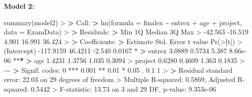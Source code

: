 \documentclass[
]{book}
\newenvironment{Shaded}{\begin{snugshade}}{\end{snugshade}}
\newcommand{\AttributeTok}[1]{\textcolor[rgb]{0.77,0.63,0.00}{#1}}
\newcommand{\DecValTok}[1]{\textcolor[rgb]{0.00,0.00,0.81}{#1}}
\newcommand{\ErrorTok}[1]{\textcolor[rgb]{0.64,0.00,0.00}{\textbf{#1}}}
\newcommand{\FloatTok}[1]{\textcolor[rgb]{0.00,0.00,0.81}{#1}}
\newcommand{\FunctionTok}[1]{\textcolor[rgb]{0.00,0.00,0.00}{#1}}
\newcommand{\NormalTok}[1]{#1}
\newcommand{\SpecialCharTok}[1]{\textcolor[rgb]{0.00,0.00,0.00}{#1}}
\newcommand{\StringTok}[1]{\textcolor[rgb]{0.31,0.60,0.02}{#1}}
\theoremstyle{definition}
\theoremstyle{definition}
\theoremstyle{definition}
\theoremstyle{definition}
\theoremstyle{remark}
\begin{document}
\hfill\break
\textbf{Model 2:}

\begin{Shaded}
\begin{Highlighting}[]
\FunctionTok{summary}\NormalTok{(model2)}
\SpecialCharTok{\textgreater{}} 
\ErrorTok{\textgreater{}}\NormalTok{ Call}\SpecialCharTok{:}
\ErrorTok{\textgreater{}} \FunctionTok{lm}\NormalTok{(}\AttributeTok{formula =}\NormalTok{ finalex }\SpecialCharTok{\textasciitilde{}}\NormalTok{ entrex }\SpecialCharTok{+}\NormalTok{ age }\SpecialCharTok{+}\NormalTok{ project, }\AttributeTok{data =}\NormalTok{ ExamData)}
\SpecialCharTok{\textgreater{}} 
\ErrorTok{\textgreater{}}\NormalTok{ Residuals}\SpecialCharTok{:}
\ErrorTok{\textgreater{}}\NormalTok{     Min      1Q  Median      3Q     Max }
\SpecialCharTok{\textgreater{}} \SpecialCharTok{{-}}\FloatTok{42.563} \SpecialCharTok{{-}}\FloatTok{16.519}   \FloatTok{4.901}  \FloatTok{16.991}  \FloatTok{36.424} 
\SpecialCharTok{\textgreater{}} 
\ErrorTok{\textgreater{}}\NormalTok{ Coefficients}\SpecialCharTok{:}
\ErrorTok{\textgreater{}}\NormalTok{              Estimate Std. Error t value }\FunctionTok{Pr}\NormalTok{(}\SpecialCharTok{\textgreater{}}\ErrorTok{|}\NormalTok{t}\SpecialCharTok{|}\NormalTok{)    }
\SpecialCharTok{\textgreater{}}\NormalTok{ (Intercept) }\SpecialCharTok{{-}}\FloatTok{117.9159}    \FloatTok{46.4211}  \SpecialCharTok{{-}}\FloatTok{2.540}   \FloatTok{0.0167} \SpecialCharTok{*}  
\ErrorTok{\textgreater{}}\NormalTok{ entrex         }\FloatTok{3.0889}     \FloatTok{0.5734}   \FloatTok{5.387} \FloatTok{8.66e{-}06} \SpecialCharTok{**}\ErrorTok{*}
\ErrorTok{\textgreater{}}\NormalTok{ age            }\FloatTok{1.4231}     \FloatTok{1.3756}   \FloatTok{1.035}   \FloatTok{0.3094}    
\SpecialCharTok{\textgreater{}}\NormalTok{ project        }\FloatTok{0.6280}     \FloatTok{0.4609}   \FloatTok{1.363}   \FloatTok{0.1835}    
\SpecialCharTok{\textgreater{}} \SpecialCharTok{{-}{-}{-}}
\ErrorTok{\textgreater{}}\NormalTok{ Signif. codes}\SpecialCharTok{:}  \DecValTok{0} \StringTok{\textquotesingle{}***\textquotesingle{}} \FloatTok{0.001} \StringTok{\textquotesingle{}**\textquotesingle{}} \FloatTok{0.01} \StringTok{\textquotesingle{}*\textquotesingle{}} \FloatTok{0.05} \StringTok{\textquotesingle{}.\textquotesingle{}} \FloatTok{0.1} \StringTok{\textquotesingle{} \textquotesingle{}} \DecValTok{1}
\SpecialCharTok{\textgreater{}} 
\ErrorTok{\textgreater{}}\NormalTok{ Residual standard error}\SpecialCharTok{:} \FloatTok{22.03}\NormalTok{ on }\DecValTok{29}\NormalTok{ degrees of freedom}
\SpecialCharTok{\textgreater{}}\NormalTok{ Multiple R}\SpecialCharTok{{-}}\NormalTok{squared}\SpecialCharTok{:}  \FloatTok{0.5869}\NormalTok{,  Adjusted R}\SpecialCharTok{{-}}\NormalTok{squared}\SpecialCharTok{:}  \FloatTok{0.5442} 
\SpecialCharTok{\textgreater{}}\NormalTok{ F}\SpecialCharTok{{-}}\NormalTok{statistic}\SpecialCharTok{:} \FloatTok{13.73}\NormalTok{ on }\DecValTok{3}\NormalTok{ and }\DecValTok{29}\NormalTok{ DF,  p}\SpecialCharTok{{-}}\NormalTok{value}\SpecialCharTok{:} \FloatTok{9.353e{-}06}
\end{Highlighting}
\end{Shaded}
\end{document}
